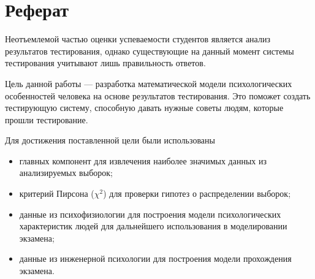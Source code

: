 \chapter*{Реферат}

Неотъемлемой частью оценки успеваемости студентов является анализ результатов
тестирования, однако существующие на данный момент системы тестирования
учитывают лишь правильность ответов.

Цель данной работы --- разработка математической модели психологических
особенностей человека на основе результатов тестирования.
Это поможет создать тестирующую систему, способную давать нужные советы
людям, которые прошли тестирование.

Для достижения поставленной цели были использованы
\begin{itemize}
  \item 
    главных компонент для извлечения наиболее значимых  данных из анализируемых
    выборок;
  \item
    критерий Пирсона ($\chi^2$) для проверки гипотез о распределении выборок;
  \item
    данные из психофизиологии для построения модели психологических
    характеристик людей для дальнейшего использования в моделировании экзамена;
  \item
    данные из инженерной психологии для построения модели прохождения экзамена.
\end{itemize}
